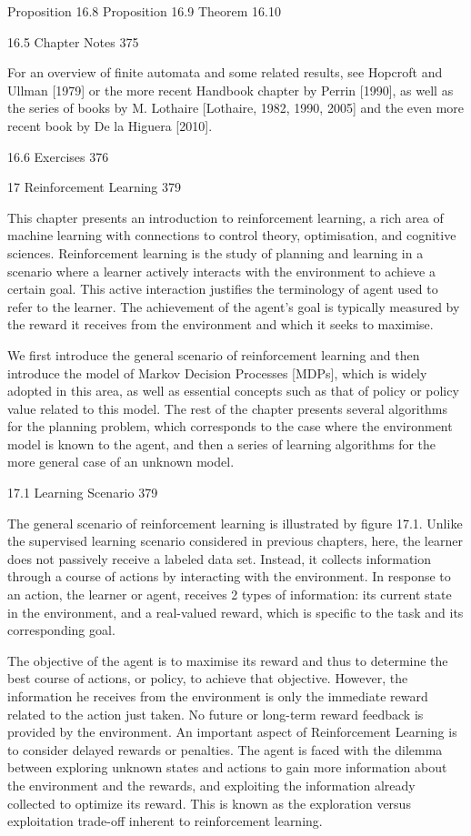 Proposition 16.8
Proposition 16.9
Theorem 16.10

16.5 Chapter Notes 375

For an overview of finite automata and some related results, see Hopcroft and Ullman [1979] or the more recent Handbook chapter by Perrin [1990], as well as the series of books by M. Lothaire [Lothaire, 1982, 1990, 2005] and the even more recent book by De la Higuera [2010].

16.6 Exercises 376



17 Reinforcement Learning 379

This chapter presents an introduction to reinforcement learning, a rich area of machine learning with connections to control theory, optimisation, and cognitive sciences. Reinforcement learning is the study of planning and learning in a scenario where a learner actively interacts with the environment to achieve a certain goal. This active interaction justifies the terminology of agent used to refer to the learner. The achievement of the agent's goal is typically measured by the reward it receives from the environment and which it seeks to maximise.

We first introduce the general scenario of reinforcement learning and then introduce the model of Markov Decision Processes [MDPs], which is widely adopted in this area, as well as essential concepts such as that of policy or policy value related to this model. The rest of the chapter presents several algorithms for the planning problem, which corresponds to the case where the environment model is known to the agent, and then a series of learning algorithms for the more general case of an unknown model.

17.1 Learning Scenario 379

The general scenario of reinforcement learning is illustrated by figure 17.1. Unlike the supervised learning scenario considered in previous chapters, here, the learner does not passively receive a labeled data set. Instead, it collects information through a course of actions by interacting with the environment. In response to an action, the learner or agent, receives 2 types of information: its current state in the environment, and a real-valued reward, which is specific to the task and its corresponding goal.

The objective of the agent is to maximise its reward and thus to determine the best course of actions, or policy, to achieve that objective. However, the information he receives from the environment is only the immediate reward related to the action just taken. No future or long-term reward feedback is provided by the environment. An important aspect of Reinforcement Learning is to consider delayed rewards or penalties. The agent is faced with the dilemma between exploring unknown states and actions to gain more information about the environment and the rewards, and exploiting the information already collected to optimize its reward. This is known as the exploration versus exploitation trade-off inherent to reinforcement learning.

